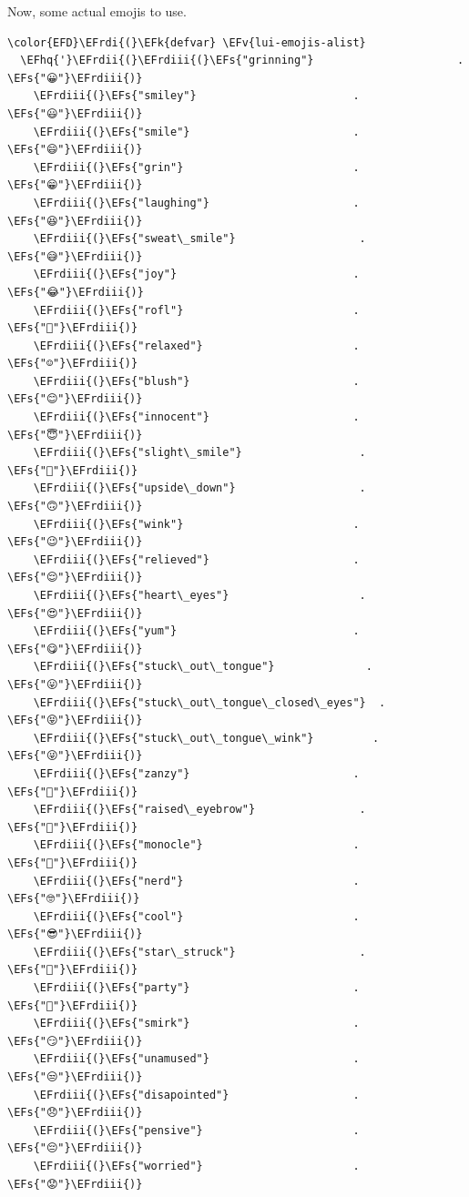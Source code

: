 \documentclass{scrartcl}
\newcommand{\EFk}[1]{\textcolor{EFk}{#1}} %
\newcommand{\EFs}[1]{\textcolor{EFs}{#1}} %
\newcommand{\EFv}[1]{\textcolor{EFv}{#1}} %
\newcommand{\EFhq}[1]{#1} %
\newcommand{\EFrdi}[1]{#1} %
\newcommand{\EFrdii}[1]{#1} %
\newcommand{\EFrdiii}[1]{#1} %
\begin{document}
Now, some actual emojis to use.
\begin{Code}
\begin{Verbatim}[]
\color{EFD}\EFrdi{(}\EFk{defvar} \EFv{lui-emojis-alist}
  \EFhq{'}\EFrdii{(}\EFrdiii{(}\EFs{"grinning"}                      . \EFs{"😀"}\EFrdiii{)}
    \EFrdiii{(}\EFs{"smiley"}                        . \EFs{"😃"}\EFrdiii{)}
    \EFrdiii{(}\EFs{"smile"}                         . \EFs{"😄"}\EFrdiii{)}
    \EFrdiii{(}\EFs{"grin"}                          . \EFs{"😁"}\EFrdiii{)}
    \EFrdiii{(}\EFs{"laughing"}                      . \EFs{"😆"}\EFrdiii{)}
    \EFrdiii{(}\EFs{"sweat\_smile"}                   . \EFs{"😅"}\EFrdiii{)}
    \EFrdiii{(}\EFs{"joy"}                           . \EFs{"😂"}\EFrdiii{)}
    \EFrdiii{(}\EFs{"rofl"}                          . \EFs{"🤣"}\EFrdiii{)}
    \EFrdiii{(}\EFs{"relaxed"}                       . \EFs{"☺️"}\EFrdiii{)}
    \EFrdiii{(}\EFs{"blush"}                         . \EFs{"😊"}\EFrdiii{)}
    \EFrdiii{(}\EFs{"innocent"}                      . \EFs{"😇"}\EFrdiii{)}
    \EFrdiii{(}\EFs{"slight\_smile"}                  . \EFs{"🙂"}\EFrdiii{)}
    \EFrdiii{(}\EFs{"upside\_down"}                   . \EFs{"🙃"}\EFrdiii{)}
    \EFrdiii{(}\EFs{"wink"}                          . \EFs{"😉"}\EFrdiii{)}
    \EFrdiii{(}\EFs{"relieved"}                      . \EFs{"😌"}\EFrdiii{)}
    \EFrdiii{(}\EFs{"heart\_eyes"}                    . \EFs{"😍"}\EFrdiii{)}
    \EFrdiii{(}\EFs{"yum"}                           . \EFs{"😋"}\EFrdiii{)}
    \EFrdiii{(}\EFs{"stuck\_out\_tongue"}              . \EFs{"😛"}\EFrdiii{)}
    \EFrdiii{(}\EFs{"stuck\_out\_tongue\_closed\_eyes"}  . \EFs{"😝"}\EFrdiii{)}
    \EFrdiii{(}\EFs{"stuck\_out\_tongue\_wink"}         . \EFs{"😜"}\EFrdiii{)}
    \EFrdiii{(}\EFs{"zanzy"}                         . \EFs{"🤪"}\EFrdiii{)}
    \EFrdiii{(}\EFs{"raised\_eyebrow"}                . \EFs{"🤨"}\EFrdiii{)}
    \EFrdiii{(}\EFs{"monocle"}                       . \EFs{"🧐"}\EFrdiii{)}
    \EFrdiii{(}\EFs{"nerd"}                          . \EFs{"🤓"}\EFrdiii{)}
    \EFrdiii{(}\EFs{"cool"}                          . \EFs{"😎"}\EFrdiii{)}
    \EFrdiii{(}\EFs{"star\_struck"}                   . \EFs{"🤩"}\EFrdiii{)}
    \EFrdiii{(}\EFs{"party"}                         . \EFs{"🥳"}\EFrdiii{)}
    \EFrdiii{(}\EFs{"smirk"}                         . \EFs{"😏"}\EFrdiii{)}
    \EFrdiii{(}\EFs{"unamused"}                      . \EFs{"😒"}\EFrdiii{)}
    \EFrdiii{(}\EFs{"disapointed"}                   . \EFs{"😞"}\EFrdiii{)}
    \EFrdiii{(}\EFs{"pensive"}                       . \EFs{"😔"}\EFrdiii{)}
    \EFrdiii{(}\EFs{"worried"}                       . \EFs{"😟"}\EFrdiii{)}

\end{Verbatim}
\end{Code}
\end{document}
